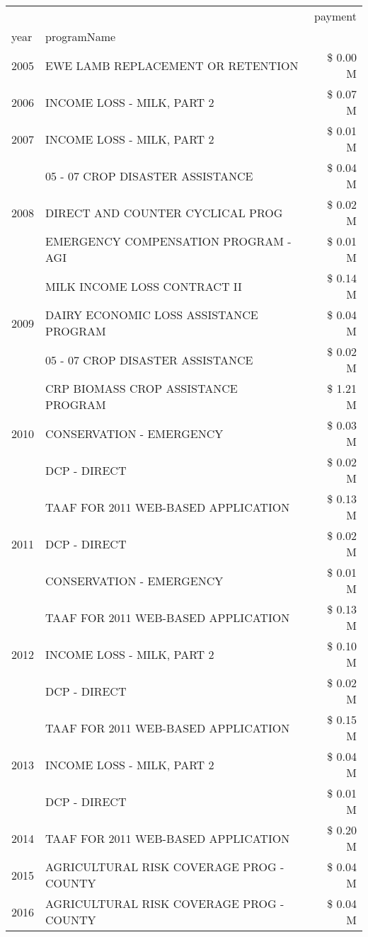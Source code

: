 \begin{tabular}{llr}
\toprule
 &  & payment \\
year & programName &  \\
\midrule
2005 & EWE LAMB REPLACEMENT OR RETENTION & \$ 0.00 M \\
\cline{1-3}
2006 & INCOME LOSS - MILK, PART 2 & \$ 0.07 M \\
\cline{1-3}
2007 & INCOME LOSS - MILK, PART 2 & \$ 0.01 M \\
\cline{1-3}
\multirow[t]{3}{*}{2008} & 05 - 07 CROP DISASTER ASSISTANCE & \$ 0.04 M \\
 & DIRECT AND COUNTER CYCLICAL PROG & \$ 0.02 M \\
 & EMERGENCY COMPENSATION PROGRAM - AGI & \$ 0.01 M \\
\cline{1-3}
\multirow[t]{3}{*}{2009} & MILK INCOME LOSS CONTRACT II & \$ 0.14 M \\
 & DAIRY ECONOMIC LOSS ASSISTANCE PROGRAM & \$ 0.04 M \\
 & 05 - 07 CROP DISASTER ASSISTANCE & \$ 0.02 M \\
\cline{1-3}
\multirow[t]{3}{*}{2010} & CRP BIOMASS CROP ASSISTANCE PROGRAM & \$ 1.21 M \\
 & CONSERVATION - EMERGENCY & \$ 0.03 M \\
 & DCP - DIRECT & \$ 0.02 M \\
\cline{1-3}
\multirow[t]{3}{*}{2011} & TAAF FOR 2011 WEB-BASED APPLICATION & \$ 0.13 M \\
 & DCP - DIRECT & \$ 0.02 M \\
 & CONSERVATION - EMERGENCY & \$ 0.01 M \\
\cline{1-3}
\multirow[t]{3}{*}{2012} & TAAF FOR 2011 WEB-BASED APPLICATION & \$ 0.13 M \\
 & INCOME LOSS - MILK, PART 2 & \$ 0.10 M \\
 & DCP - DIRECT & \$ 0.02 M \\
\cline{1-3}
\multirow[t]{3}{*}{2013} & TAAF FOR 2011 WEB-BASED APPLICATION & \$ 0.15 M \\
 & INCOME LOSS - MILK, PART 2 & \$ 0.04 M \\
 & DCP - DIRECT & \$ 0.01 M \\
\cline{1-3}
2014 & TAAF FOR 2011 WEB-BASED APPLICATION & \$ 0.20 M \\
\cline{1-3}
2015 & AGRICULTURAL RISK COVERAGE PROG - COUNTY & \$ 0.04 M \\
\cline{1-3}
\multirow[t]{3}{*}{2016} & AGRICULTURAL RISK COVERAGE PROG - COUNTY & \$ 0.04 M \\

\end{tabular}
